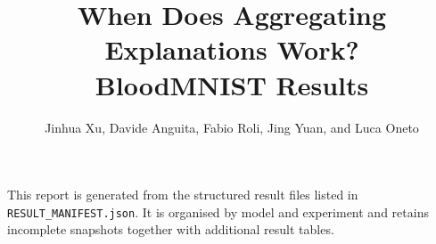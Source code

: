 \documentclass[10pt,a4paper]{article}
\title{When Does Aggregating Explanations Work?\\\large BloodMNIST Results}
\author{Jinhua Xu, Davide Anguita, Fabio Roli, Jing Yuan, and Luca Oneto}
\date{}
\begin{document}
\maketitle

\noindent
This report is generated from the structured result files listed in
\texttt{RESULT\_MANIFEST.json}. It is organised by model and experiment
and retains incomplete snapshots together with additional result tables.


\end{document}
